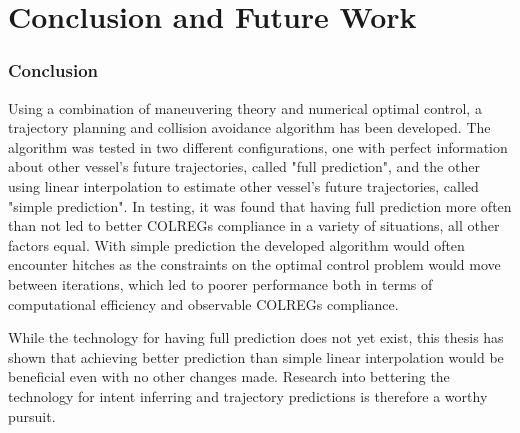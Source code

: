 \blankpage
\section{Conclusion and Future Work}

\subsubsection*{Conclusion}


Using a combination of maneuvering theory and numerical optimal control, a trajectory planning and collision avoidance
algorithm has been developed. The algorithm was tested in two different configurations, one with perfect information about
other vessel's future trajectories, called "full prediction", and the other using linear interpolation to estimate other vessel's future trajectories, called "simple prediction".
In testing, it was found that having full prediction more often than not led to better COLREGs compliance in a variety of situations, all other factors equal.
With simple prediction the developed algorithm would often encounter hitches as the constraints on the optimal control problem would move between iterations,
which led to poorer performance both in terms of computational efficiency and observable COLREGs compliance.

While the technology for having full prediction does not yet exist, this thesis has shown that achieving better prediction than simple linear interpolation
would be beneficial even with no other changes made. Research into bettering the technology for intent inferring and trajectory predictions is therefore
a worthy pursuit.

